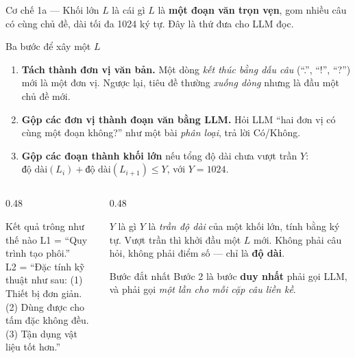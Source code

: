 \documentclass[aspectratio=169,10pt]{beamer}
\begin{document}
\begin{frame}{Cơ chế 1a --- Khối lớn $L$ là cái gì}
  {\footnotesize $L$ là \textbf{một đoạn văn trọn vẹn}, gom nhiều câu có cùng chủ đề,
  dài tối đa 1024 ký tự. Đây là thứ đưa cho LLM đọc.}
  \begin{block}{\small Ba bước để xây một $L$}
    \footnotesize
    \begin{enumerate}
      \itemsep1pt
      \item \textbf{Tách thành đơn vị văn bản.} Một dòng \emph{kết thúc bằng dấu câu}
            (``.'', ``!'', ``?'') mới là một đơn vị. Ngược lại, tiêu đề thường \emph{xuống dòng}
            nhưng là đầu một chủ đề mới.
      \item \textbf{Gộp các đơn vị thành đoạn văn bằng LLM.} Hỏi LLM ``hai đơn vị có
            cùng một đoạn không?'' như một bài \emph{phân loại}, trả lời Có/Không.
      \item \textbf{Gộp các đoạn thành khối lớn} nếu tổng độ dài chưa vượt trần $Y$:
            $\text{độ dài}(L_i) + \text{độ dài}(L_{i+1}) \le Y$, với $Y = 1024$.
    \end{enumerate}
  \end{block}
  \begin{columns}[T]
    \begin{column}{0.48\textwidth}
      \begin{block}{\small Kết quả trông như thế nào}
        \footnotesize\ttfamily
        L1 = ``Quy trình tạo phôi.''\\
        L2 = ``Đặc tính kỹ thuật như sau: (1) Thiết bị đơn giản.\\
        \phantom{L2 = }\phantom{``}(2) Dùng được cho tấm đặc không đều.\\
        \phantom{L2 = }\phantom{``}(3) Tận dụng vật liệu tốt hơn.''
      \end{block}
    \end{column}
    \begin{column}{0.48\textwidth}
      \begin{block}{\small $Y$ là gì}
        \footnotesize $Y$ là \emph{trần độ dài} của một khối lớn, tính bằng ký tự.
        Vượt trần thì khởi đầu một $L$ mới. Không phải câu hỏi, không phải điểm số ---
        chỉ là \textbf{độ dài}.
      \end{block}
      \begin{alertblock}{\small Bước đắt nhất}
        \footnotesize Bước 2 là bước \textbf{duy nhất} phải gọi LLM, và phải gọi
        \emph{một lần cho mỗi cặp câu liền kề}.
      \end{alertblock}
    \end{column}
  \end{columns}
\end{frame}
\end{document}
